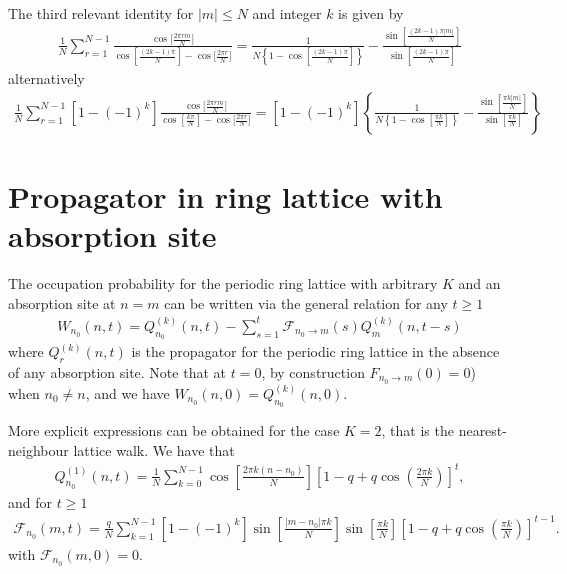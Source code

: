 \documentclass[10pt, hidelinks, superscriptaddress, amsmath, amssymb, aps, pre]{revtex4-2}
\begin{document}
The third relevant identity for $|m|\leq N$ and integer $k$ is given by
\begin{align}
\frac{1}{N}\sum_{r=1}^{N-1}\frac{\cos\Big[\frac{2\pi r m}{N}\Big]}{\cos\left[\frac{(2k-1)\pi}{N}\right]-\cos\Big[\frac{2\pi r}{N}\Big]}=\frac{1}{N\left\{1-\cos\left[\frac{(2k-1)\pi}{N}\right]\right\}}-\frac{\sin\left[\frac{(2k-1)\pi |m|}{N}\right]}{\sin\left[\frac{(2k-1)\pi }{N}\right]}
\label{eq:id_3}
\end{align}
alternatively
\begin{align}
\frac{1}{N}\sum_{r=1}^{N-1}\left[1-(-1)^k\right]\frac{\cos\Big[\frac{2\pi r m}{N}\Big]}{\cos\left[\frac{k\pi}{N}\right]-\cos\Big[\frac{2\pi r}{N}\Big]}=\left[1-(-1)^k\right]\left\{\frac{1}{N\left\{1-\cos\left[\frac{\pi k}{N}\right]\right\}}-\frac{\sin\left[\frac{\pi k |m|}{N}\right]}{\sin\left[\frac{\pi k}{N}\right]}\right\}
\label{eq:id_4}
\end{align}

\section*{Propagator in ring lattice with absorption site}

The occupation probability for the periodic ring lattice with arbitrary $K$ and an absorption site at $n=m$ can be written via the general relation for any $t\geq 1$
\begin{align}
W_{n_0}(n,t)=Q^{(k)}_{n_0}(n,t)-\sum_{s=1}^{t}\mathcal{F}_{n_0\to m}(s)Q^{(k)}_{m}(n,t-s)
\label{eq:Abs_prop_ring}
\end{align}
where $Q^{(k)}_{r}(n,t)$ is the propagator for the periodic ring lattice in the absence of any absorption site. Note that at $t=0$, by construction $F_{n_0\to m}(0)=0$) when $n_0\not= n$, and we have $W_{n_0}(n,0)=Q^{(k)}_{n_0}(n,0)$.

More explicit expressions can be obtained for the case $K=2$, that is the nearest-neighbour lattice walk. We have that
\begin{align}
Q^{(1)}_{n_0}(n,t)=\frac{1}{N}\sum_{k=0}^{N-1}\cos\left[\frac{2\pi k (n-n_0)}{N}\right]\left[1-q+q\cos\left(\frac{2\pi k}{N}\right)\right]^t,
\label{eq:Q1}
\end{align}
and for $t\geq 1$
\begin{align}
\mathcal{F}_{n_0}(m,t)=\frac{q}{N}\sum_{k=1}^{N-1}\left[1-(-1)^k\right]\sin\left[\frac{|m-n_0|\pi k}{N}\right]\sin\left[\frac{\pi k}{N}\right]\left[1-q+q\cos\left(\frac{\pi k}{N}\right)\right]^{t-1}.
\label{eq:fp_0}
\end{align}
with $\mathcal{F}_{n_0}(m,0)=0$.
\end{document}
